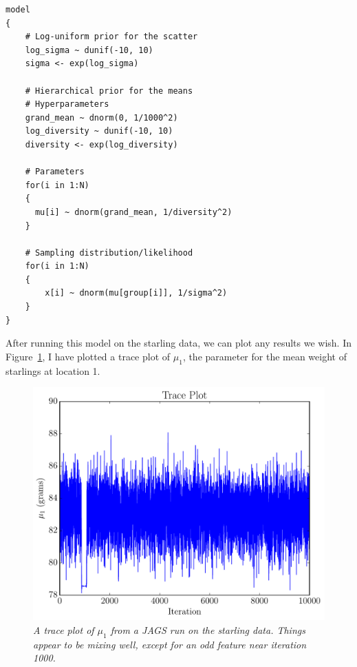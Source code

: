 \begin{verbatim}
model
{
    # Log-uniform prior for the scatter
    log_sigma ~ dunif(-10, 10)
    sigma <- exp(log_sigma)

    # Hierarchical prior for the means
    # Hyperparameters
    grand_mean ~ dnorm(0, 1/1000^2)
    log_diversity ~ dunif(-10, 10)
    diversity <- exp(log_diversity)

    # Parameters
    for(i in 1:N)
    {
      mu[i] ~ dnorm(grand_mean, 1/diversity^2)
    }

    # Sampling distribution/likelihood
    for(i in 1:N)
    {
        x[i] ~ dnorm(mu[group[i]], 1/sigma^2)
    }
}
\end{verbatim}

After running this model on the starling data, we can plot any results we
wish. In Figure~\ref{fig:trace_starlings2}, I have plotted a trace plot of
$\mu_1$, the parameter for the mean weight of starlings at location 1.

\begin{figure}[ht!]
\begin{center}
\includegraphics[scale=0.6]{Figures/trace_starlings.pdf}
\caption{\it A trace plot of $\mu_1$ from a JAGS run on the starling data. Things
appear to be mixing well, except for an odd feature near iteration 1000.
\label{fig:trace_starlings2}}
\end{center}
\end{figure}

